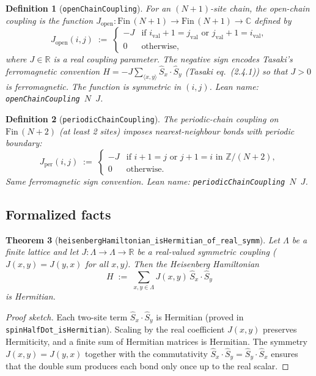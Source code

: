 \documentclass[a4paper,11pt]{article}
\newtheorem{theorem}{Theorem}
\newtheorem{definition}[theorem]{Definition}
\begin{document}
\begin{definition}[\texttt{openChainCoupling}]
For an $(N{+}1)$-site chain, the \emph{open-chain coupling} is the
function $J_{\mathrm{open}} : \mathrm{Fin}\,(N{+}1) \to
\mathrm{Fin}\,(N{+}1) \to \mathbb{C}$ defined by
\[
  J_{\mathrm{open}}(i,j) \;:=\;
  \begin{cases}
    -J & \text{if } i_{\mathrm{val}} + 1 = j_{\mathrm{val}}
        \text{ or } j_{\mathrm{val}} + 1 = i_{\mathrm{val}},\\
    0 & \text{otherwise,}
  \end{cases}
\]
where $J \in \mathbb{R}$ is a real coupling parameter.  The negative
sign encodes Tasaki's ferromagnetic convention $H = -J\sum_{\langle
x,y\rangle} \hat S_x\!\cdot\!\hat S_y$ (Tasaki eq.~(2.4.1)) so that
$J > 0$ is ferromagnetic.  The function is symmetric in $(i,j)$.
Lean name: \texttt{openChainCoupling~$N$~$J$}.
\end{definition}

\begin{definition}[\texttt{periodicChainCoupling}]
The \emph{periodic-chain coupling} on $\mathrm{Fin}\,(N{+}2)$ (at
least 2 sites) imposes nearest-neighbour bonds with periodic boundary:
\[
  J_{\mathrm{per}}(i,j) \;:=\;
  \begin{cases}
    -J & \text{if } i + 1 = j \text{ or } j + 1 = i \text{ in } \mathbb{Z}/(N{+}2),\\
    0 & \text{otherwise.}
  \end{cases}
\]
Same ferromagnetic sign convention.
Lean name: \texttt{periodicChainCoupling~$N$~$J$}.
\end{definition}

\subsection{Formalized facts}

\begin{theorem}[\texttt{heisenbergHamiltonian\_isHermitian\_of\_real\_symm}]
Let $\Lambda$ be a finite lattice and let
$J : \Lambda \to \Lambda \to \mathbb{R}$ be a real-valued symmetric
coupling ($J(x,y) = J(y,x)$ for all $x,y$).  Then the Heisenberg
Hamiltonian
\[
  H \;:=\; \sum_{x,y \in \Lambda} J(x,y)\,\hat S_x \cdot \hat S_y
\]
is Hermitian.
\end{theorem}

\begin{proof}[Proof sketch]
Each two-site term $\hat S_x \cdot \hat S_y$ is Hermitian
(proved in \texttt{spinHalfDot\_isHermitian}).  Scaling by the real
coefficient $J(x,y)$ preserves Hermiticity, and a finite sum of
Hermitian matrices is Hermitian.  The symmetry $J(x,y) = J(y,x)$
together with the commutativity $\hat S_x \cdot \hat S_y =
\hat S_y \cdot \hat S_x$ ensures that the double sum produces each bond
only once up to the real scalar.
\end{proof}
\end{document}
